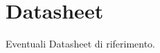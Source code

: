 \chapter{Datasheet}
\label{appendiceF}
\thispagestyle{empty}

\noindent Eventuali Datasheet di riferimento.